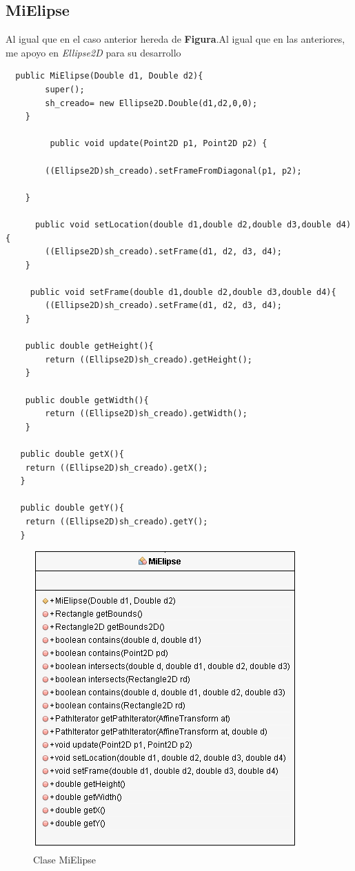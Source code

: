 \subsection{MiElipse}
Al igual que en el caso anterior hereda de \textbf{Figura}.Al igual que en las anteriores, me apoyo en \emph{Ellipse2D} para su desarrollo\cite{Ellipse}
\begin{lstlisting}
  public MiElipse(Double d1, Double d2){
        super();
        sh_creado= new Ellipse2D.Double(d1,d2,0,0);
    }
    
         public void update(Point2D p1, Point2D p2) {
        
        ((Ellipse2D)sh_creado).setFrameFromDiagonal(p1, p2);
       
    }

      public void setLocation(double d1,double d2,double d3,double d4){
        ((Ellipse2D)sh_creado).setFrame(d1, d2, d3, d4);
    }
     
     public void setFrame(double d1,double d2,double d3,double d4){
        ((Ellipse2D)sh_creado).setFrame(d1, d2, d3, d4);
    }

    public double getHeight(){
        return ((Ellipse2D)sh_creado).getHeight();
    }
 
    public double getWidth(){
        return ((Ellipse2D)sh_creado).getWidth();
    } 
 
   public double getX(){ 
    return ((Ellipse2D)sh_creado).getX();
   }
  
   public double getY(){ 
    return ((Ellipse2D)sh_creado).getY();
   }
\end{lstlisting}
\begin{figure}[H]
  \centering
    \includegraphics[scale=0.55]{images/mielipse2}
  \caption{Clase MiElipse}
  \label{Clases MiElipse}
\end{figure}
